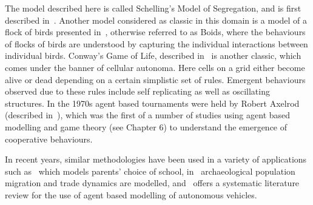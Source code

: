 The model described here is called Schelling's Model of Segregation, and is
first described in~\cite{schelling2006micromotives}. Another model
considered as classic in this domain is a model of a flock of birds presented
in~\cite{reynolds1987flocks}, otherwise referred to as Boids, where the
behaviours of flocks of birds are understood by capturing the individual
interactions between individual birds. Conway's Game of Life, described
in~\cite{gardener1970mathematical} is another classic, which comes under
the banner of cellular autonoma. Here cells on a grid either become alive or dead
depending on a certain simplistic set of rules. Emergent behaviours observed due
to these rules include self replicating as well as oscillating structures.
In the 1970s agent based tournaments were held by Robert Axelrod (described
in~\cite{axelrod1981evolution}), which was the first of a number of studies
using agent based modelling and game theory (see Chapter 6) to understand the
emergence of cooperative behaviours.

In recent years, similar methodologies have been used in a variety of
applications such as~\cite{diaz2021agent} which models parents' choice of school,
in~\cite{romanowska2019agent} archaeological population migration and trade
dynamics are modelled, and~\cite{jing2020agent} offers a systematic
literature review for the use of agent based modelling of autonomous vehicles.


